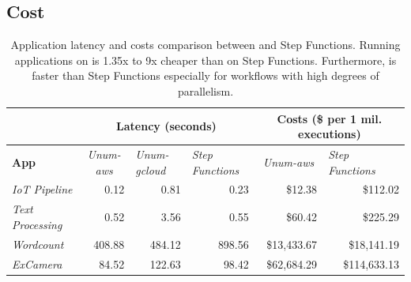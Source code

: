 \subsection{Cost}

\begin{table}[t]
  \centering
  \begin{tabular}{|l|rrr|rr|}
\hline
                         & \multicolumn{3}{c|}{\textbf{Latency (seconds)}}                    & \multicolumn{2}{c|}{\textbf{Costs (\$ per 1 mil. executions)}} \\ \hline
\textbf{App} &
  \multicolumn{1}{c|}{\textit{Unum-aws}} &
  \multicolumn{1}{l|}{\textit{Unum-gcloud}} &
  \multicolumn{1}{l|}{\textit{Step Functions}} &
  \multicolumn{1}{c|}{\textit{Unum-aws}} &
  \multicolumn{1}{l|}{\textit{Step Functions}} \\ \hline
\textit{IoT Pipeline}    & \multicolumn{1}{r|}{0.12}   & \multicolumn{1}{r|}{0.81}   & 0.23   & \multicolumn{1}{r|}{\$12.38}             & \$112.02            \\ \hline
\textit{Text Processing} & \multicolumn{1}{r|}{0.52}   & \multicolumn{1}{r|}{3.56}   & 0.55   & \multicolumn{1}{r|}{\$60.42}             & \$225.29            \\ \hline
\textit{Wordcount}       & \multicolumn{1}{r|}{408.88} & \multicolumn{1}{r|}{484.12} & 898.56 & \multicolumn{1}{r|}{\$13,433.67}         & \$18,141.19         \\ \hline
\textit{ExCamera}        & \multicolumn{1}{r|}{84.52}  & \multicolumn{1}{r|}{122.63} & 98.42  & \multicolumn{1}{r|}{\$62,684.29}         & \$114,633.13        \\ \hline
\end{tabular}
  \caption{Application latency and costs comparison between \name{} and Step
    Functions. Running applications on \name{} is 1.35x to 9x cheaper than
    on Step Functions. Furthermore, \name{} is faster than Step Functions
    especially for workflows with high degrees of parallelism.}
  \label{table:macro}
\end{table}

